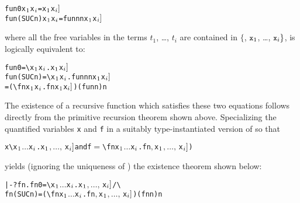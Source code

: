 \begin{hol}\begin{alltt}
   fun 0       x\(\sb{1}\) \m{\dots} x\(\sb{i}\) = \m{f\sb{1}[}x\(\sb{1}\)\m{,\ldots,\,} x\(\sb{i}]\)
   fun (SUC n) x\(\sb{1}\) \m{\dots} x\(\sb{i}\) = \m{f\sb{2}[}fun n  n\m{,} x\(\sb{1}\)\m{,\ldots,\,}x\(\sb{i}]\)
\end{alltt}\end{hol}

\noindent where all the free variables in the  terms $t_1$,
\dots, $t_i$ are contained in $\{$, $\ml{x}_1$, \dots, $\ml{x}_i\}$,
is logically equivalent to:

\begin{hol}\begin{alltt}
   fun 0       = \verb!\!x\(\sb{1}\) \m{\dots} x\(\sb{i}\).\m{f\sb{1}[}x\(\sb{1}\)\m{,\ldots,\,}x\(\sb{i}]\)
   fun (SUC n) = \verb!\!x\(\sb{1}\) \m{\dots} x\(\sb{i}\).\m{f\sb{2}[}fun n  n\m{,}x\(\sb{1}\)\m{,\ldots,\,}x\(\sb{i}]\)
               = (\verb!\!f n x\(\sb{1}\) \m{\dots} x\(\sb{i}\).\m{f\sb{2}[}f  n\m{,} x\(\sb{1}\)\m{,\ldots,\,}x\(\sb{i}]\)) (fun n) n
\end{alltt}\end{hol}

The existence  of  a  recursive  function   which  satisfies these two
equations follows directly from the primitive recursion theorem
 shown above.   Specializing the  quantified variables \verb!x!
and \verb!f!  in  a suitably  type-instantiated version  of  so
that

\begin{hol}\begin{alltt}
   x\m{=}\verb!\!x\(\sb{1}\) \(\dots\) x\(\sb{i}\).\m{f\sb{1}[}x\(\sb{1}\)\(,\ldots,\,\)x\(\sb{i}]\)  {\rm and}  f\(=\)\verb!\!f n x\(\sb{1}\) \(\dots\) x\(\sb{i}\).\m{f\sb{2}[}f  n\(,\) x\(\sb{1}\)\(,\ldots,\,\)x\(\sb{i}]\))
\end{alltt}\end{hol}

\noindent yields (ignoring the uniqueness of )
the existence theorem shown below:

\begin{hol}\begin{alltt}
   |- ?fn. fn 0       = \verb!\!x\(\sb{1}\) \(\dots\) x\(\sb{i}\).\m{f\sb{1}[}x\(\sb{1}\)\(,\ldots,\,\)x\(\sb{i}]\) /\verb!\!
           fn (SUC n) = (\verb!\!f n x\(\sb{1}\) \(\dots\) x\(\sb{i}\).\m{f\sb{2}[}f  n\(,\) x\(\sb{1}\)\(,\ldots,\,\)x\(\sb{i}]\)) (fn n) n
\end{alltt}\end{hol}

